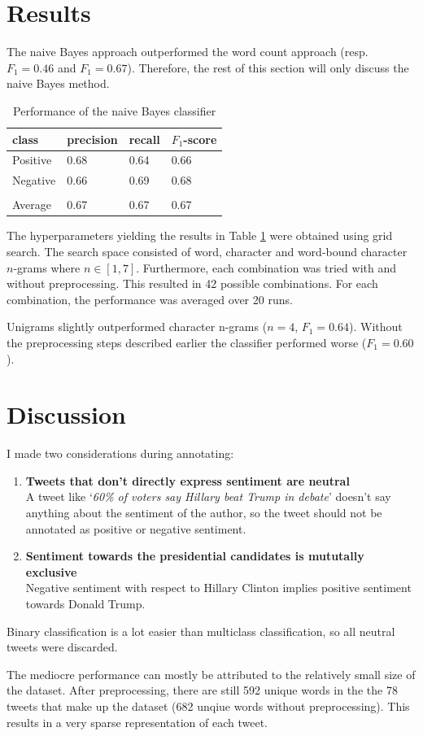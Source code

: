 \documentclass{article}
\begin{document}
\section{Results}
The naive Bayes approach outperformed the word count approach (resp. $F_1=0.46$ and $F_1=0.67$). Therefore, the rest of this section will only discuss the naive Bayes method.

\begin{table}
\centering
\begin{tabular}{llll}
\toprule
\textbf{class} & \textbf{precision} & \textbf{recall} & \textbf{$F_1$-score} \\
\midrule
Positive & 0.68 & 0.64 & 0.66 \\
Negative & 0.66 & 0.69 & 0.68 \\
& & & \\
Average & 0.67 & 0.67 & 0.67 \\
\bottomrule
\end{tabular}
\caption{Performance of the naive Bayes classifier}
\label{tbl:performance}
\end{table}
The hyperparameters yielding the results in Table \ref{tbl:performance} were obtained using grid search. The search space consisted of word, character and word-bound character $n$-grams where $n \in [1, 7]$. Furthermore, each combination was tried with and without preprocessing. This resulted in 42 possible combinations. For each combination, the performance was averaged over 20 runs.
\par Unigrams slightly outperformed character n-grams ($n=4$, $F_1=0.64$). Without the preprocessing steps described earlier the classifier performed worse ($F_1=0.60$). 

\section{Discussion}
I made two considerations during annotating:
\begin{enumerate}
\item \textbf{Tweets that don't directly express sentiment are neutral} \\
A tweet like `\emph{60\% of voters say Hillary beat Trump in debate}' doesn't say anything about the sentiment of the author, so the tweet should not be annotated as positive or negative sentiment.
\item \textbf{Sentiment towards the presidential candidates is mututally exclusive} \\
Negative sentiment with respect to Hillary Clinton implies positive sentiment towards Donald Trump.
\end{enumerate}
Binary classification is a lot easier than multiclass classification, so all neutral tweets were discarded.
\par The mediocre performance can mostly be attributed to the relatively small size of the dataset. After preprocessing, there are still 592 unique words in the the 78 tweets that make up the dataset (682 unqiue words without preprocessing). This results in a very sparse representation of each tweet.
\end{document}
